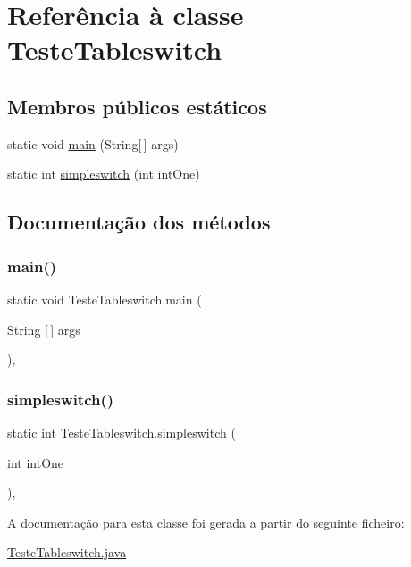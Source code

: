 \hypertarget{class_teste_tableswitch}{}\section{Referência à classe Teste\+Tableswitch}
\label{class_teste_tableswitch}
\subsection*{Membros públicos estáticos}
\begin{DoxyCompactItemize}
\item 
static void \hyperlink{class_teste_tableswitch_a92a775bd66dd429352f37680edfd2da2}{main} (String\mbox{[}$\,$\mbox{]} args)
\item 
static int \hyperlink{class_teste_tableswitch_a5a3f0d49474f24c47d704f2c8477e6f4}{simpleswitch} (int int\+One)
\end{DoxyCompactItemize}


\subsection{Documentação dos métodos}
\hypertarget{class_teste_tableswitch_a92a775bd66dd429352f37680edfd2da2}{}\label{class_teste_tableswitch_a92a775bd66dd429352f37680edfd2da2} 
\subsubsection{\texorpdfstring{main()}{main()}}
{\footnotesize\ttfamily static void Teste\+Tableswitch.\+main (\begin{DoxyParamCaption}\item[{String \mbox{[}$\,$\mbox{]}}]{args }\end{DoxyParamCaption})\hspace{0.3cm}{\ttfamily [inline]}, {\ttfamily [static]}}

\hypertarget{class_teste_tableswitch_a5a3f0d49474f24c47d704f2c8477e6f4}{}\label{class_teste_tableswitch_a5a3f0d49474f24c47d704f2c8477e6f4} 
\subsubsection{\texorpdfstring{simpleswitch()}{simpleswitch()}}
{\footnotesize\ttfamily static int Teste\+Tableswitch.\+simpleswitch (\begin{DoxyParamCaption}\item[{int}]{int\+One }\end{DoxyParamCaption})\hspace{0.3cm}{\ttfamily [inline]}, {\ttfamily [static]}}



A documentação para esta classe foi gerada a partir do seguinte ficheiro\+:\begin{DoxyCompactItemize}
\item 
\hyperlink{_teste_tableswitch_8java}{Teste\+Tableswitch.\+java}\end{DoxyCompactItemize}
